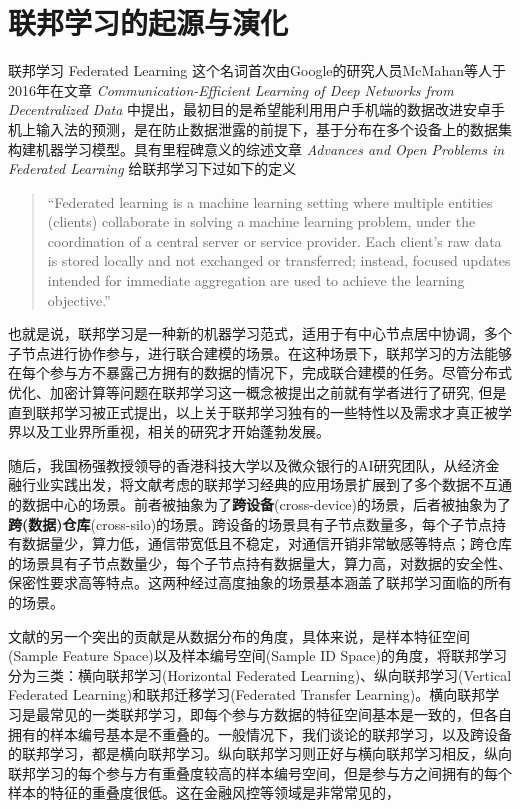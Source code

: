 \section{联邦学习的起源与演化}
\label{sec:fl_origin}

联邦学习 Federated Learning 这个名词首次由Google的研究人员McMahan等人于2016年在文章 \emph{Communication-Efficient Learning of Deep Networks from Decentralized Data}\cite{mcmahan2017fed_avg} 中提出，最初目的是希望能利用用户手机端的数据改进安卓手机上输入法的预测，是在防止数据泄露的前提下，基于分布在多个设备上的数据集构建机器学习模型。具有里程碑意义的综述文章 \emph{Advances and Open Problems in Federated Learning}\cite{kairouz2019advances_fl} 给联邦学习下过如下的定义

\begin{quote}
    ``Federated learning is a machine learning setting where multiple entities (clients) collaborate in solving a machine learning problem, under the coordination of a central server or service provider. Each client's raw data is stored locally and not exchanged or transferred; instead, focused updates intended for immediate aggregation are used to achieve the learning objective.''
\end{quote}

也就是说，联邦学习是一种新的机器学习范式，适用于有中心节点居中协调，多个子节点进行协作参与，进行联合建模的场景。在这种场景下，联邦学习的方法能够在每个参与方不暴露己方拥有的数据的情况下，完成联合建模的任务。尽管分布式优化、加密计算等问题在联邦学习这一概念被提出之前就有学者进行了研究\cite{boyd2011distributed, dist_pca_2014_nips, Gentry_2009_FHE, Nikolaenko_2013}, 但是直到联邦学习被正式提出\cite{mcmahan2017fed_avg}，以上关于联邦学习独有的一些特性以及需求才真正被学界以及工业界所重视，相关的研究才开始蓬勃发展。

随后，我国杨强教授领导的香港科技大学以及微众银行的AI研究团队，从经济金融行业实践出发，将文献\parencite{mcmahan2017fed_avg}考虑的联邦学习经典的应用场景扩展到了多个数据不互通的数据中心的场景\cite{Yang_2019_VFL}。前者被抽象为了\textbf{跨设备}(cross-device)的场景，后者被抽象为了\textbf{跨(数据)仓库}(cross-silo)的场景\cite{kairouz2019advances_fl}。跨设备的场景具有子节点数量多，每个子节点持有数据量少，算力低，通信带宽低且不稳定，对通信开销非常敏感等特点；跨仓库的场景具有子节点数量少，每个子节点持有数据量大，算力高，对数据的安全性、保密性要求高等特点。这两种经过高度抽象的场景基本涵盖了联邦学习面临的所有的场景。

文献\parencite{Yang_2019_VFL}的另一个突出的贡献是从数据分布的角度，具体来说，是样本特征空间(Sample Feature Space)以及样本编号空间(Sample ID Space)的角度，将联邦学习分为三类：横向联邦学习(Horizontal Federated Learning)、纵向联邦学习(Vertical Federated Learning)和联邦迁移学习(Federated Transfer Learning)。横向联邦学习是最常见的一类联邦学习，即每个参与方数据的特征空间基本是一致的，但各自拥有的样本编号基本是不重叠的。一般情况下，我们谈论的联邦学习，以及跨设备的联邦学习，都是横向联邦学习。纵向联邦学习则正好与横向联邦学习相反，纵向联邦学习的每个参与方有重叠度较高的样本编号空间，但是参与方之间拥有的每个样本的特征的重叠度很低。这在金融风控等领域是非常常见的，

